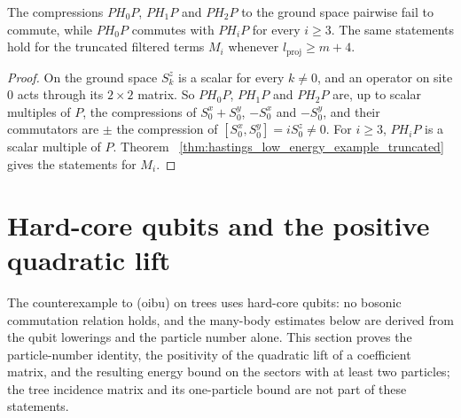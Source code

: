 \begin{lemma}
    \label{thm:hastings_low_energy_example_commutators}
    \leanok
    The compressions $PH_0P$, $PH_1P$ and $PH_2P$ to the ground space
    pairwise fail to commute, while $PH_0P$ commutes with $PH_iP$ for every
    $i\ge3$. The same statements hold for the truncated filtered terms
    $M_i$ whenever $l_{\mathrm{proj}}\ge m+4$.
\end{lemma}
\begin{proof}\leanok
    On the ground space $S^z_k$ is a scalar for every $k\neq0$, and an
    operator on site $0$ acts through its $2\times2$ matrix. So $PH_0P$,
    $PH_1P$ and $PH_2P$ are, up to scalar multiples of $P$, the
    compressions of $S^x_0+S^y_0$, $-S^x_0$ and $-S^y_0$, and their
    commutators are $\pm$ the compression of $[S^x_0,S^y_0]=iS^z_0\neq0$. For
    $i\ge3$, $PH_iP$ is a scalar multiple of $P$. Theorem~
    \ref{thm:hastings_low_energy_example_truncated} gives the statements
    for $M_i$.
\end{proof}

\section{Hard-core qubits and the positive quadratic lift}
\label{sec:low_energy_hard_core}

The counterexample to (oibu) on trees \cite{gap:hastings05_tree_basis_counterexample}
uses hard-core qubits: no bosonic commutation relation holds, and the
many-body estimates below are derived from the qubit lowerings and the
particle number alone. This section proves the particle-number identity, the
positivity of the quadratic lift of a coefficient matrix, and the resulting
energy bound on the sectors with at least two particles; the tree incidence
matrix and its one-particle bound are not part of these statements.

